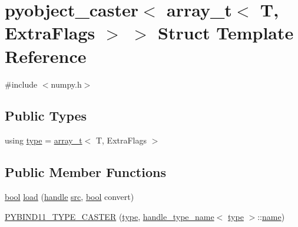 \hypertarget{structpyobject__caster_3_01array__t_3_01_t_00_01_extra_flags_01_4_01_4}{}\section{pyobject\+\_\+caster$<$ array\+\_\+t$<$ T, Extra\+Flags $>$ $>$ Struct Template Reference}
\label{structpyobject__caster_3_01array__t_3_01_t_00_01_extra_flags_01_4_01_4}


{\ttfamily \#include $<$numpy.\+h$>$}

\subsection*{Public Types}
\begin{DoxyCompactItemize}
\item 
using \mbox{\hyperlink{structpyobject__caster_3_01array__t_3_01_t_00_01_extra_flags_01_4_01_4_a05e8f86e245a6b880cd647b83c2fbd75}{type}} = \mbox{\hyperlink{classarray__t}{array\+\_\+t}}$<$ T, Extra\+Flags $>$
\end{DoxyCompactItemize}
\subsection*{Public Member Functions}
\begin{DoxyCompactItemize}
\item 
\mbox{\hyperlink{asdl_8h_af6a258d8f3ee5206d682d799316314b1}{bool}} \mbox{\hyperlink{structpyobject__caster_3_01array__t_3_01_t_00_01_extra_flags_01_4_01_4_af469a144594ab1c83932bccc33f4daf9}{load}} (\mbox{\hyperlink{classhandle}{handle}} \mbox{\hyperlink{_s_d_l__opengl__glext_8h_a72e0fdf0f845ded60b1fada9e9195cd7}{src}}, \mbox{\hyperlink{asdl_8h_af6a258d8f3ee5206d682d799316314b1}{bool}} convert)
\item 
\mbox{\hyperlink{structpyobject__caster_3_01array__t_3_01_t_00_01_extra_flags_01_4_01_4_a65398f53f654664d102b75c5818b515c}{P\+Y\+B\+I\+N\+D11\+\_\+\+T\+Y\+P\+E\+\_\+\+C\+A\+S\+T\+ER}} (\mbox{\hyperlink{structpyobject__caster_3_01array__t_3_01_t_00_01_extra_flags_01_4_01_4_a05e8f86e245a6b880cd647b83c2fbd75}{type}}, \mbox{\hyperlink{structhandle__type__name}{handle\+\_\+type\+\_\+name}}$<$ \mbox{\hyperlink{structpyobject__caster_3_01array__t_3_01_t_00_01_extra_flags_01_4_01_4_a05e8f86e245a6b880cd647b83c2fbd75}{type}} $>$\+::\mbox{\hyperlink{structname}{name}})
\end{DoxyCompactItemize}
